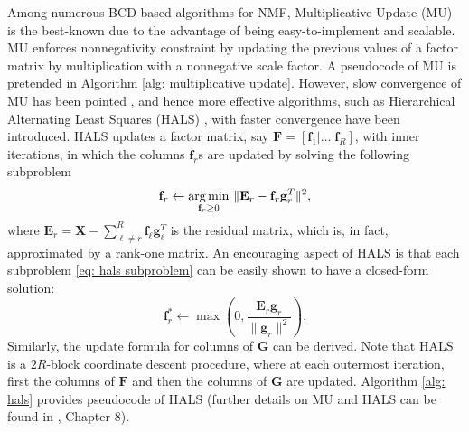 \documentclass[a4,12pt]{article}
\begin{document}
	Among numerous BCD-based algorithms for NMF, Multiplicative Update (MU) \citep{lee1999learning} is the best-known due to the advantage of being easy-to-implement and scalable. MU enforces nonnegativity constraint by updating the previous values of a factor matrix by multiplication with a nonnegative scale factor. A pseudocode of MU is pretended in Algorithm \ref{alg: multiplicative update}. However, slow convergence of MU has been pointed \citep{gillis2020nonnegative}, and hence more effective algorithms, such as Hierarchical Alternating Least Squares (HALS) \citep{cichocki2009fast}, with faster convergence have been introduced. HALS updates a factor matrix, say $ \mathbf{F} = [\mathbf{f}_1 | \dots | \mathbf{f}_R] $, with inner iterations, in which the columns $ \mathbf{f}_r $s are updated by solving the following subproblem
	\begin{equation}
		\label{eq: hals subproblem} 
		\mathbf{f}_r \gets \underset{\mathbf{f}_r \geq 0}{\argmin} \ \lVert \mathbf{E}_r - \mathbf{f}_r \mathbf{g}_r^T \rVert^2,
	\end{equation}
	where $ \mathbf{E}_r = \mathbf{X} - \sum_{\ell \neq r}^{R} \mathbf{f}_\ell \mathbf{g}_\ell^T $ is the residual matrix, which is, in fact, approximated by a rank-one matrix. An encouraging aspect of HALS is that each subproblem \eqref{eq: hals subproblem} can be easily shown to have a closed-form solution:
	\begin{equation}
		\label{eq: hals subproblem solution} 
		\mathbf{f}_r^* \gets \max(0, \frac{\mathbf{E}_r \mathbf{g}_r}{\lVert \mathbf{g}_r \rVert^2}).
	\end{equation}
	Similarly, the update formula for columns of $ \mathbf{G} $ can be derived. Note that HALS is a $ 2R $-block coordinate descent procedure, where at each outermost iteration, first the columns of $ \mathbf{F} $ and then the columns of $ \mathbf{G} $ are updated. Algorithm \ref{alg: hals} provides pseudocode of HALS (further details on MU and HALS can be found in \citep{gillis2020nonnegative}, Chapter 8). 
	
\end{document}
